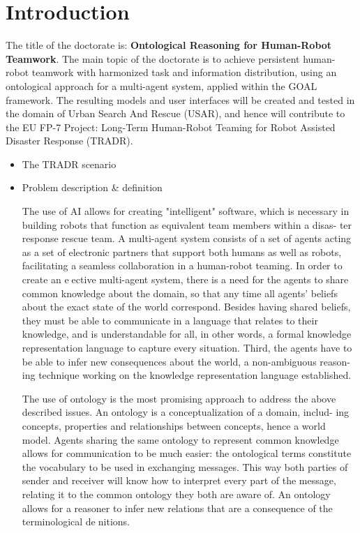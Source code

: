 \chapter{Introduction}
The title of the doctorate is: \textbf{Ontological Reasoning for Human-Robot Teamwork}.
The main topic of the doctorate is to achieve persistent human-robot teamwork with harmonized task and information distribution, using an ontological approach for a multi-agent system, applied within the GOAL framework. The resulting models and user interfaces will be created and tested in the domain of Urban Search And Rescue (USAR), and hence will contribute to the EU FP-7 Project: Long-Term Human-Robot Teaming for Robot Assisted Disaster Response (TRADR).




\begin{itemize}
\item The TRADR scenario

\item Problem description & definition 

The use of AI allows for creating "intelligent" software, which is necessary
in building robots that function as equivalent team members within a disas-
ter response rescue team. A multi-agent system consists of a set of agents
acting as a set of electronic partners that support both humans as well as
robots, facilitating a seamless collaboration in a human-robot teaming. In
order to create an eective multi-agent system, there is a need for the agents
to share common knowledge about the domain, so that any time all agents'
beliefs about the exact state of the world correspond. Besides having shared
beliefs, they must be able to communicate in a language that relates to their
knowledge, and is understandable for all, in other words, a formal knowledge
representation language to capture every situation. Third, the agents have to
be able to infer new consequences about the world, a non-ambiguous reason-
ing technique working on the knowledge representation language established.

The use of ontology is the most promising approach to address the above
described issues. An ontology is a conceptualization of a domain, includ-
ing concepts, properties and relationships between concepts, hence a world
model. Agents sharing the same ontology to represent common knowledge
allows for communication to be much easier: the ontological terms constitute
the vocabulary to be used in exchanging messages. This way both parties
of sender and receiver will know how to interpret every part of the message,
relating it to the common ontology they both are aware of. An ontology
allows for a reasoner to infer new relations that are a consequence of the
terminological denitions.


\end{itemize}
